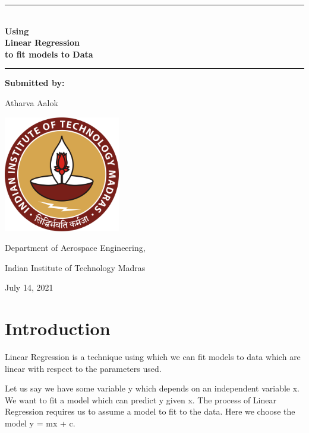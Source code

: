 \documentclass[14pt]{article}
\begin{document}
    \begin{titlepage}
        \begin{center}
            \rule{\textwidth}{1pt}\\
            \Huge
            \textbf{Using \\ Linear Regression \\ to fit models to Data }\\
            \rule{\textwidth}{1pt}
            \vfill
            
            \Large
            \textbf{Submitted by:}
            \medskip

            Atharva Aalok
            \vfill

            \includegraphics[width = 2in]{Images/IITM_logo.svg.png}
            \vfill

            Department of Aerospace Engineering,
            \medskip

            Indian Institute of Technology Madras
            \vfill

            July 14, 2021

        \end{center}
    \end{titlepage}


    \renewcommand*\contentsname{\huge Summary}
    \large
    \tableofcontents
    \normalsize


    \pagebreak
    \huge
    \section{Introduction}
    \normalsize
    Linear Regression is a technique using which we can fit models to data which are linear with respect to the parameters used.

    Let us say we have some variable y which depends on an independent variable x.
    We want to fit a model which can predict y given x.
    The process of Linear Regression requires us to assume a model to fit to the data.
    Here we choose the model y = mx + c.
\end{document}
